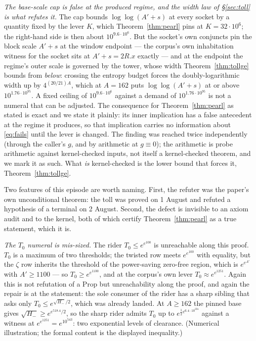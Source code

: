 \documentclass[11pt]{amsart}
\theoremstyle{remark}
\begin{document}
\emph{The base-scale cap is false at the produced regime, and the width law of
\S\ref{sec:toll} is what refutes it.} The cap bounds $\log\log(A'+s)$ at every
socket by a quantity fixed by the lever $K$, which Theorem~\ref{thm:pearl}
pins at $K = 32\cdot10^{6}$; the right-hand side is then about $10^{9.6\cdot
10^{6}}$. But the socket's own conjuncts pin the block scale $A'+s$ at the
window endpoint --- the corpus's own inhabitation witness for the socket sits
at $A'+s = 2R.x$ exactly --- and at the endpoint the regime's outer scale is
governed by the tower, whose width Theorem~\ref{thm:tollge} bounds from
\emph{below}: crossing the entropy budget forces the doubly-logarithmic width
up by $4^{(20/21)A}$, which at $A = 162$ puts $\log\log(A'+s)$ at or above
$10^{1.76\cdot10^{95}}$. A fixed ceiling of $10^{9.6\cdot10^{6}}$ against a
demand of $10^{1.76\cdot10^{95}}$ is not a numeral that can be adjusted. The
consequence for Theorem~\ref{thm:pearl} as stated is exact and we state it
plainly: its inner implication has a false antecedent at the regime it
produces, so that implication carries no information about
\eqref{eq:fails} until the lever is changed. The finding was reached twice
independently (through the caller's $g$, and by arithmetic at $g \equiv 0$);
the arithmetic is probe arithmetic against kernel-checked inputs, not itself a
kernel-checked theorem, and we mark it as such. What \emph{is} kernel-checked
is the lower bound that forces it, Theorem~\ref{thm:tollge}.

Two features of this episode are worth naming. First, the refuter was the
paper's own unconditional theorem: the toll was proved on 1 August and refuted
a hypothesis of a terminal on 2 August. Second, the defect is invisible to an
axiom audit and to the kernel, both of which certify Theorem~\ref{thm:pearl}
as a true statement, which it is.

\emph{The $T_0$ numeral is mis-sized.} The rider $T_0 \le e^{e^{100}}$ is
unreachable along this proof. $T_0$ is a maximum of two thresholds; the
twisted row meets $e^{e^{100}}$ with equality, but the $\zeta$ row inherits the
threshold of the power-saving zero-free region, which is $e^{e^{A'}}$ with
$A' \ge 1100$ --- so $T_0 \ge e^{e^{1100}}$, and at the corpus's own lever
$T_0 \approx e^{e^{1251}}$. Again this is not refutation of a Prop but
unreachability along the proof, and again the repair is at the statement: the
sole consumer of the rider has a sharp sibling that asks only
$T_0 \le e^{\sqrt{H_-}/2}$, which was already landed. At $A \ge 162$ the pinned
base gives $\sqrt{H_-} \ge e^{e^{518.4}/2}$, so the sharp rider admits
$T_0$ up to $e^{\frac12 e^{6.4\cdot10^{224}}}$ against a witness at
$e^{e^{1251}} = e^{10^{543}}$: two exponential levels of clearance. (Numerical
illustration; the formal content is the displayed inequality.)
\end{document}
